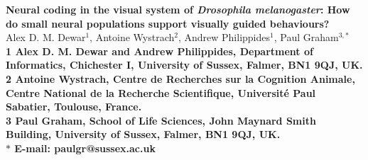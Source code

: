 \date{}

\pagestyle{myheadings}



\usepackage{verbatim} %

\usepackage[utf8]{inputenc}

\usepackage{gensymb} %



\begin{flushleft}
{\Large
\textbf{Neural coding in the visual system of \emph{Drosophila melanogaster}: How do small neural populations support visually guided behaviours?}
}
\\
Alex D. M. Dewar$^{1}$,
Antoine Wystrach$^{2}$,
Andrew Philippides$^{1}$,
Paul Graham$^{3,\ast}$
\\
\bf{1} Alex D. M. Dewar and Andrew Philippides, Department of Informatics, Chichester I, University of Sussex, Falmer, BN1 9QJ, UK.
\\
\bf{2} Antoine Wystrach, Centre de Recherches sur la Cognition Animale, Centre National de la Recherche Scientifique, Université Paul Sabatier, Toulouse, France.
\\
\bf{3} Paul Graham, School of Life Sciences, John Maynard Smith Building, University of Sussex, Falmer, BN1 9QJ, UK.
\\
$\ast$ E-mail: paulgr@sussex.ac.uk
\end{flushleft}

